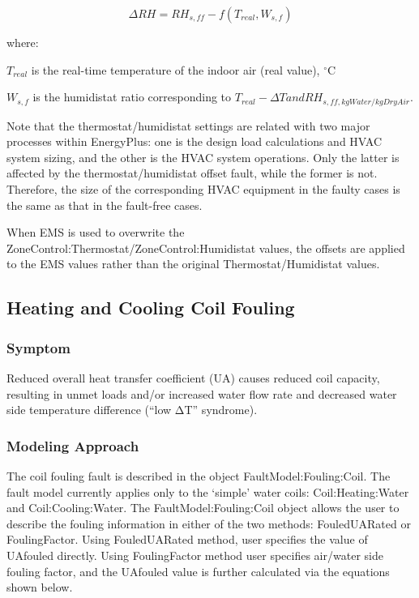 \begin{equation}
\Delta RH = RH_{s,ff} - f(T_{real}, W_{s,f})
\end{equation}

where:

\(T_{real}\) is the real-time temperature of the indoor air (real value), \(^{\circ}\)C

\(W_{s,f}\) is the humidistat ratio corresponding to \(T_{real} - \Delta T and RH_{s,ff, kgWater/kgDryAir}\).

Note that the thermostat/humidistat settings are related with two major processes within EnergyPlus: one is the design load calculations and HVAC system sizing, and the other is the HVAC system operations. Only the latter is affected by the thermostat/humidistat offset fault, while the former is not. Therefore, the size of the corresponding HVAC equipment in the faulty cases is the same as that in the fault-free cases.

When EMS is used to overwrite the ZoneControl:Thermostat/ZoneControl:Humidistat values, the offsets are applied to the EMS values rather than the original Thermostat/Humidistat values.

\subsection{Heating and Cooling Coil Fouling}\label{heating-and-cooling-coil-fouling}

\subsubsection{Symptom}\label{symptom-2}

Reduced overall heat transfer coefficient (UA) causes reduced coil capacity, resulting in unmet loads and/or increased water flow rate and decreased water side temperature difference (``low ΔT'' syndrome).

\subsubsection{Modeling Approach}\label{modeling-approach-2}

The coil fouling fault is described in the object FaultModel:Fouling:Coil. The fault model currently applies only to the `simple' water coils: Coil:Heating:Water and Coil:Cooling:Water. The FaultModel:Fouling:Coil object allows the user to describe the fouling information in either of the two methods: FouledUARated or FoulingFactor. Using FouledUARated method, user specifies the value of UAfouled directly. Using FoulingFactor method user specifies air/water side fouling factor, and the UAfouled value is further calculated via the equations shown below.

